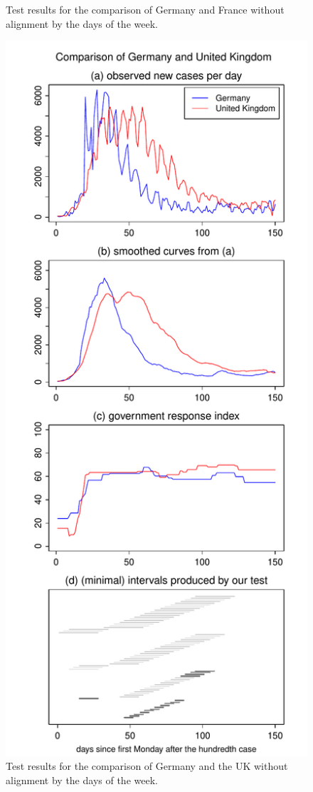 \documentclass[a4paper,12pt]{article}
\numberwithin{equation}{section}
\begin{document}
{\begin{figure}[h!]
\begin{minipage}[t]{0.49\textwidth}
\caption{Test results for the comparison of Germany and France without alignment by the days of the week.}
\end{minipage}
\hspace{0.25cm}
\begin{minipage}[t]{0.49\textwidth}
\includegraphics[width=\textwidth]{plots/DEU_vs_GBR_wa}
\caption{Test results for the comparison of Germany and the UK without alignment by the days of the week.}
\end{minipage}
\end{figure}



}
\end{document}
